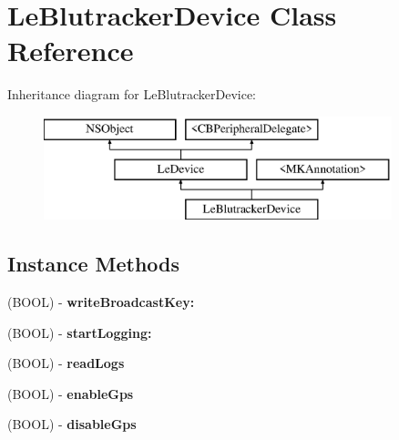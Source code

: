 \hypertarget{interface_le_blutracker_device}{}\section{Le\+Blutracker\+Device Class Reference}
\label{interface_le_blutracker_device}
Inheritance diagram for Le\+Blutracker\+Device\+:\begin{figure}[H]
\begin{center}
\leavevmode
\includegraphics[height=3.000000cm]{interface_le_blutracker_device}
\end{center}
\end{figure}
\subsection*{Instance Methods}
\begin{DoxyCompactItemize}
\item 
\hypertarget{interface_le_blutracker_device_a1069f534927de0b2d43adf52ff11f9fa}{}(B\+O\+O\+L) -\/ {\bfseries write\+Broadcast\+Key\+:}\label{interface_le_blutracker_device_a1069f534927de0b2d43adf52ff11f9fa}

\item 
\hypertarget{interface_le_blutracker_device_ad989a1f91e3109a89eb19f22c9664539}{}(B\+O\+O\+L) -\/ {\bfseries start\+Logging\+:}\label{interface_le_blutracker_device_ad989a1f91e3109a89eb19f22c9664539}

\item 
\hypertarget{interface_le_blutracker_device_a88f48fa6071e0780a09d236686d342a9}{}(B\+O\+O\+L) -\/ {\bfseries read\+Logs}\label{interface_le_blutracker_device_a88f48fa6071e0780a09d236686d342a9}

\item 
\hypertarget{interface_le_blutracker_device_ae03c6e7f97cb35e11e7624ff650fcdcb}{}(B\+O\+O\+L) -\/ {\bfseries enable\+Gps}\label{interface_le_blutracker_device_ae03c6e7f97cb35e11e7624ff650fcdcb}

\item 
\hypertarget{interface_le_blutracker_device_a5f0826b438553fe172fbaffa18bbb23f}{}(B\+O\+O\+L) -\/ {\bfseries disable\+Gps}\label{interface_le_blutracker_device_a5f0826b438553fe172fbaffa18bbb23f}

\end{DoxyCompactItemize}
